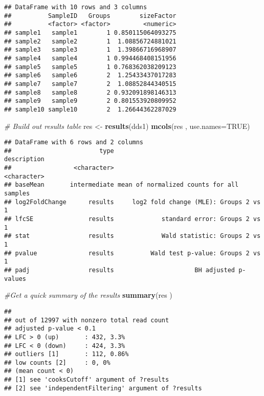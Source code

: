 \documentclass[]{article}
\newenvironment{Shaded}{\begin{snugshade}}{\end{snugshade}}
\newcommand{\CommentTok}[1]{\textcolor[rgb]{0.56,0.35,0.01}{\textit{#1}}}
\newcommand{\DataTypeTok}[1]{\textcolor[rgb]{0.13,0.29,0.53}{#1}}
\newcommand{\KeywordTok}[1]{\textcolor[rgb]{0.13,0.29,0.53}{\textbf{#1}}}
\newcommand{\NormalTok}[1]{#1}
\newcommand{\OtherTok}[1]{\textcolor[rgb]{0.56,0.35,0.01}{#1}}
\newcommand{\StringTok}[1]{\textcolor[rgb]{0.31,0.60,0.02}{#1}}
\begin{document}
\begin{verbatim}
## DataFrame with 10 rows and 3 columns
##          SampleID   Groups        sizeFactor
##          <factor> <factor>         <numeric>
## sample1   sample1        1 0.850115064093275
## sample2   sample2        1  1.08856724881021
## sample3   sample3        1  1.39866716968907
## sample4   sample4        1 0.994468408151956
## sample5   sample5        1 0.768362038209123
## sample6   sample6        2  1.25433437017283
## sample7   sample7        2  1.08852844340515
## sample8   sample8        2 0.932091898146313
## sample9   sample9        2 0.801553920809952
## sample10 sample10        2  1.26644362287029
\end{verbatim}

\begin{Shaded}
\begin{Highlighting}[]
\CommentTok{# Build out results table}
\NormalTok{res <-}\StringTok{ }\KeywordTok{results}\NormalTok{(dds1)}
\KeywordTok{mcols}\NormalTok{(res , }\DataTypeTok{use.names=}\OtherTok{TRUE}\NormalTok{)}
\end{Highlighting}
\end{Shaded}

\begin{verbatim}
## DataFrame with 6 rows and 2 columns
##                        type                               description
##                 <character>                               <character>
## baseMean       intermediate mean of normalized counts for all samples
## log2FoldChange      results     log2 fold change (MLE): Groups 2 vs 1
## lfcSE               results             standard error: Groups 2 vs 1
## stat                results             Wald statistic: Groups 2 vs 1
## pvalue              results          Wald test p-value: Groups 2 vs 1
## padj                results                      BH adjusted p-values
\end{verbatim}

\begin{Shaded}
\begin{Highlighting}[]
\CommentTok{#Get a quick summary of the results}
\KeywordTok{summary}\NormalTok{(res )}
\end{Highlighting}
\end{Shaded}

\begin{verbatim}
## 
## out of 12997 with nonzero total read count
## adjusted p-value < 0.1
## LFC > 0 (up)       : 432, 3.3%
## LFC < 0 (down)     : 424, 3.3%
## outliers [1]       : 112, 0.86%
## low counts [2]     : 0, 0%
## (mean count < 0)
## [1] see 'cooksCutoff' argument of ?results
## [2] see 'independentFiltering' argument of ?results
\end{verbatim}
\end{document}
